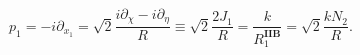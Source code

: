 \begin{equation}    \label{eq:p1J1}
p_1 =  -i \partial_{x_1} 
    =\sqrt{2} \frac{  i\partial_\chi -  i\partial_\eta}{R} \equiv \sqrt{2}\frac{2 J_1}{R}
= \frac{k}{R_1^{\mathbf{IIB}}} = \sqrt{2}\frac{k N_2}{R}.
\end{equation}

